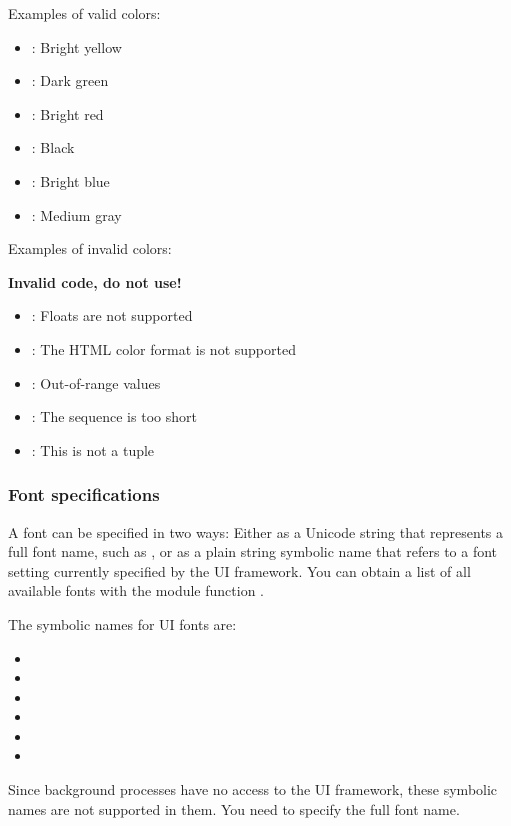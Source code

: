 Examples of valid colors:

\begin{itemize}
\item {}: Bright yellow
\item {}: Dark green
\item {}: Bright red
\item {}: Black
\item {}: Bright blue
\item {}: Medium gray
\end{itemize}

Examples of invalid colors:

\textbf{Invalid code, do not use!}
\begin{itemize}
\item {}: Floats are not supported
\item {}: The HTML color format is not supported
\item {}: Out-of-range values
\item {}: The sequence is too short
\item \code{[128,128,192]}: This is not a tuple
\end{itemize}

\subsubsection{Font specifications}
\label{subsubsec:font-specs}
A font can be specified in two ways: Either as a Unicode string that 
represents a full font name, such as , or as a plain 
string symbolic name that refers to a font setting currently specified by 
the UI framework. You can obtain a list of all available fonts with the 
 module function .

The symbolic names for UI fonts are:
\begin{itemize}
\item {}
\item {}
\item {}
\item {}
\item {}
\item {}
\end{itemize}
Since background processes have no access to the UI framework, these 
symbolic names are not supported in them. You need to specify the full font 
name.

